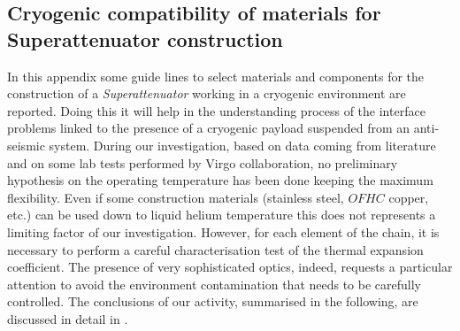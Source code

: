 \subsection{ Cryogenic compatibility of materials for Superattenuator construction}
\label{sec:cryo_filters}

In this appendix some guide lines to select materials and components for the construction of a \emph{Superattenuator} working in a cryogenic environment are reported. Doing this it will help in the understanding process of the interface problems linked to the presence of a cryogenic payload suspended from an anti-seismic system. During our investigation, based on data coming from literature and on some lab tests performed by Virgo collaboration, no preliminary hypothesis on the operating temperature has been done keeping the maximum flexibility. Even if some construction materials (stainless steel, $OFHC$ copper, etc.) can be used down to liquid helium temperature this does not represents a limiting factor of our investigation. However, for each element of the chain, it is necessary to perform a careful characterisation test of the thermal expansion coefficient. The presence of very sophisticated optics, indeed, requests a particular attention to avoid the environment contamination that needs to be carefully controlled. The conclusions of our activity, summarised in the following, are discussed in detail in \cite{Poggiani2009}.
